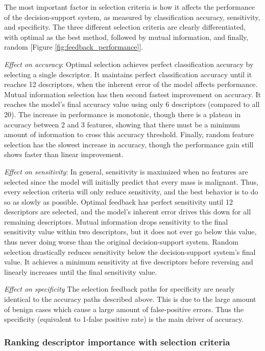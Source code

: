 The most important factor in selection criteria is how it affects the performance of the decision-support system, as measured by classification accuracy, sensitivity, and specificity. The three different selection criteria are clearly differentiated, with optimal as the best method, followed by mutual information, and finally, random [Figure \ref{fig:feedback_performance}].

\emph{Effect on accuracy}: 
Optimal selection achieves perfect classification accuracy by selecting a single descriptor. It maintains perfect classification accuracy until it reaches 12 descriptors, when the inherent error of the model affects performance. Mutual information selection has then second fastest improvement on accuracy. It reaches the model's final accuracy value using only 6 descriptors (compared to all 20). The increase in performance is monotonic, though there is a plateau in accuracy between 2 and 3 features, showing that there must be a minimum amount of information to cross this accuracy threshold. Finally, random feature selection has the slowest increase in accuracy, though the performance gain still shows faster than linear improvement.

\emph{Effect on sensitivity}:
In general, sensitivity is maximized when no features are selected since the model will initially predict that every mass is malignant. Thus, every selection criteria will only reduce sensitivity, and the best behavior is to do so as slowly as possible. Optimal feedback has perfect sensitivity until 12 descriptors are selected, and the model's inherent error drives this down for all remaining descriptors. Mutual information drops sensitivity to the final sensitivity value within two descriptors, but it does not ever go below this value, thus never doing worse than the original decision-support system. Random selection drastically reduces sensitivity below the decision-support system's final value. It achieves a minimum sensitivity at five descriptors before reversing and linearly increases until the final sensitivity value.

\emph{Effect on specificity}
The selection feedback paths for specificity are nearly identical to the accuracy paths described above. This is due to the large amount of benign cases which cause a large amount of false-positive errors. Thus the specificity (equivalent to 1-false positive rate) is the main driver of accuracy.


\subsubsection{Ranking descriptor importance with selection criteria}

